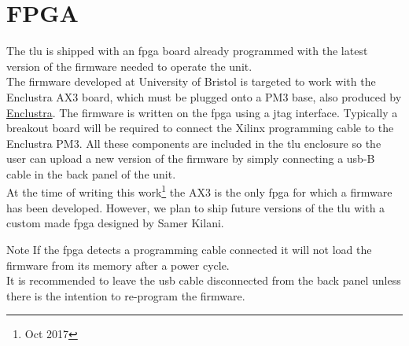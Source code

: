 \section{FPGA}
The \gls{tlu} is shipped with an \gls{fpga} board already programmed with the latest version of the firmware needed to operate the unit.\\
The firmware developed at University of Bristol is targeted to work with the Enclustra  AX3 board, which must be plugged onto a PM3 base, also produced by \href{http://www.enclustra.com/en/home/}{Enclustra}. The firmware is written on the \gls{fpga} using a \gls{jtag} interface. Typically a breakout board will be required to connect the Xilinx programming cable to the Enclustra PM3. All these components are included in the \gls{tlu} enclosure so the user can upload a new version of the firmware by simply connecting a \gls{usb}-B cable in the back panel of the unit.\\
At the time of writing this work\footnote{Oct 2017} the AX3 is the only \gls{fpga} for which a firmware has been developed. However, we plan to ship future versions of the \gls{tlu} with a custom made \gls{fpga} designed by Samer Kilani.
\begin{alertinfo}{Note}
    If the \gls{fpga} detects a programming cable connected it will not load the firmware from its memory after a power cycle.\\
    It is recommended to leave the \gls{usb} cable disconnected from the back panel unless there is the intention to re-program the firmware.
\end{alertinfo}



